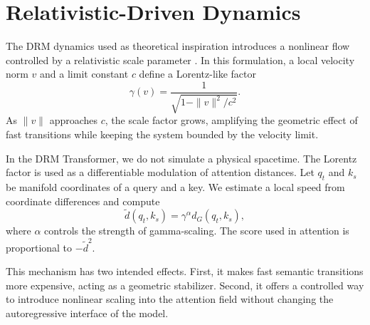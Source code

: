 \section{Relativistic-Driven Dynamics}
\label{sec:relativistic_dynamics}

The DRM dynamics used as theoretical inspiration introduces a nonlinear flow
controlled by a relativistic scale parameter \cite{muniz_relativistic_drm}. In
this formulation, a local velocity norm $v$ and a limit constant $c$ define a
Lorentz-like factor
\begin{equation}
  \gamma(v) = \frac{1}{\sqrt{1-\|v\|^2/c^2}}.
\end{equation}
As $\|v\|$ approaches $c$, the scale factor grows, amplifying the geometric
effect of fast transitions while keeping the system bounded by the velocity
limit.

In the DRM Transformer, we do not simulate a physical spacetime. The Lorentz
factor is used as a differentiable modulation of attention distances. Let
$q_t$ and $k_s$ be manifold coordinates of a query and a key. We estimate a
local speed from coordinate differences and compute
\begin{equation}
  \tilde d(q_t,k_s) = \gamma^\alpha d_G(q_t,k_s),
\end{equation}
where $\alpha$ controls the strength of gamma-scaling. The score used in
attention is proportional to $-\tilde d^2$.

This mechanism has two intended effects. First, it makes fast semantic
transitions more expensive, acting as a geometric stabilizer. Second, it offers
a controlled way to introduce nonlinear scaling into the attention field
without changing the autoregressive interface of the model.
